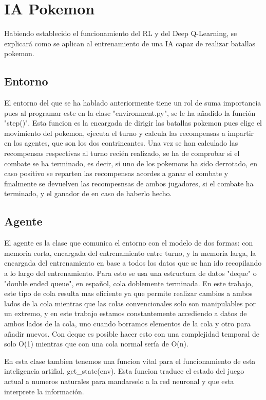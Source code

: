 \chapter{IA Pokemon}

Habiendo establecido el funcionamiento del RL y del Deep Q-Learning, se explicará como se aplican al entrenamiento de una IA capaz de realizar batallas pokemon.

\section{Entorno}

El entorno del que se ha hablado anteriormente tiene un rol de suma importancia pues al programar este en la clase "environment.py", se le ha añadido la función "step()". Esta funcion es la encargada de dirigir las batallas pokemon pues elige el movimiento del pokemon, ejecuta el turno y calcula las recompensas a impartir en los agentes, que son los dos contrincantes. Una vez se han calculado las recompensas respectivas al turno recién realizado, se ha de comprobar si el combate se ha terminado, es decir, si uno de los pokemons ha sido derrotado, en caso positivo se reparten las recompensas acordes a ganar el combate y finalmente se devuelven las recompesnsas de ambos jugadores, si el combate ha terminado, y el ganador de en caso de haberlo hecho.

\section{Agente}

El agente es la clase que comunica el entorno con el modelo de dos formas: con memoria corta, encargada del entrenamiento entre turno, y la memoria larga, la encargada del entrenamiento en base a todos los datos que se han ido recopilando a lo largo del entrenamiento. Para esto se usa una estructura de datos "deque" o "double ended queue", en español, cola doblemente terminada. En este trabajo, este tipo de cola resulta mas eficiente ya que permite realizar cambios a ambos lados de la cola mientras que las colas convencionales solo son manipulables por un extremo, y en este trabajo estamos constantemente accediendo a datos de ambos lados de la cola, uno cuando borramos elementos de la cola y otro para añadir nuevos. Con deque es posible hacer esto con una complejidad temporal de solo O(1) mientras que con una cola normal sería de O(n).

En esta clase tambien tenemos una funcion vital para el funcionamiento de esta inteligencia artifial, get_state(env). Esta funcion traduce el estado del juego actual a numeros naturales para mandarselo a la red neuronal y que esta interprete la información.
